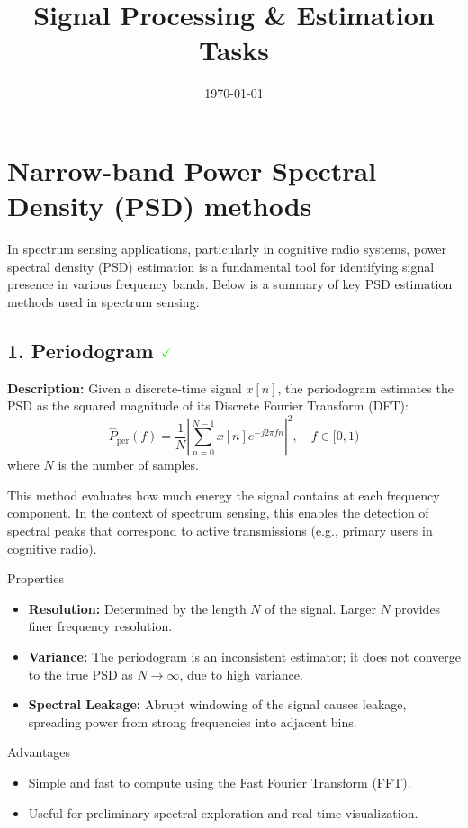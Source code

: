 \documentclass[10pt]{report}
\title{Signal Processing \& Estimation Tasks}
\date{\today}
\begin{document}
\maketitle
\section*{Narrow-band Power Spectral Density (PSD) methods}

In spectrum sensing applications, particularly in cognitive radio systems, power spectral density (PSD) estimation is a fundamental tool for identifying signal presence in various frequency bands. Below is a summary of key PSD estimation methods used in spectrum sensing:

\subsection*{1. Periodogram $\color{green} {\checkmark}$}
\textbf{Description:} Given a discrete-time signal \( x[n] \), the periodogram estimates the PSD as the squared magnitude of its Discrete Fourier Transform (DFT):
\[
\hat{P}_{\text{per}}(f) = \frac{1}{N} \left| \sum_{n=0}^{N-1} x[n] e^{-j 2 \pi f n} \right|^2, \quad f \in [0, 1)
\]
where \( N \) is the number of samples.

This method evaluates how much energy the signal contains at each frequency component. In the context of spectrum sensing, this enables the detection of spectral peaks that correspond to active transmissions (e.g., primary users in cognitive radio).

{Properties}
\begin{itemize}
	\item \textbf{Resolution:} Determined by the length \( N \) of the signal. Larger \( N \) provides finer frequency resolution.
	\item \textbf{Variance:} The periodogram is an inconsistent estimator; it does not converge to the true PSD as \( N \to \infty \), due to high variance.
	\item \textbf{Spectral Leakage:} Abrupt windowing of the signal causes leakage, spreading power from strong frequencies into adjacent bins.
\end{itemize}

{Advantages}
\begin{itemize}
	\item Simple and fast to compute using the Fast Fourier Transform (FFT).
	\item Useful for preliminary spectral exploration and real-time visualization.
\end{itemize}
\end{document}
